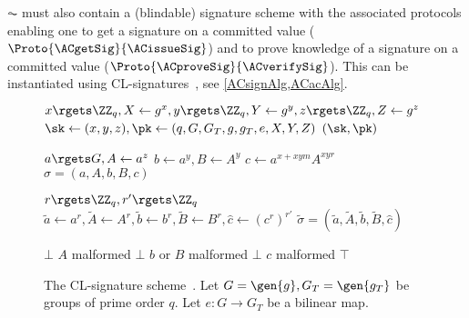 \(\AC\) must also contain a (blindable) signature scheme with the associated 
protocols enabling one to get a signature on a committed value 
(\(\Proto{\ACgetSig}{\ACissueSig}\)) and to prove knowledge of a signature on a 
committed value (\(\Proto{\ACproveSig}{\ACverifySig}\)).
This can be instantiated using CL-signatures~\cite{CLsignatures}, see 
\cref{ACsignAlg,ACacAlg}.

\begin{figure}[p]
  \small
  \begin{algorithmic}
    \Function{\CLsetup}{}
    \State $x\rgets \ZZ_q, X\gets g^x, y\rgets \ZZ_q, Y\gets g^y, z\rgets 
    \ZZ_q, Z\gets g^z$
    \State $\sk\gets (x,y,z), \pk\gets (q, G, G_T, g, g_T, e, X, Y, Z)$
    \State \Return $(\sk, \pk)$
    \EndFunction

    \State $a\rgets G, A\gets a^z$
    \State $b\gets a^y, B\gets A^y$
    \State $c\gets a^{x+xym} A^{xyr}$
    \State \Return $\sigma = (a, A, b, B, c)$
    \EndFunction

    \State $r\rgets \ZZ_q, r'\rgets \ZZ_q$
    \State $\tilde a\gets a^r, \tilde A\gets A^r,
      \tilde b\gets b^r, \tilde B\gets B^r,
      \hat c\gets (c^r)^{r'}$
    \State \Return $\tilde \sigma = (\tilde a, \tilde A,
      \tilde b, \tilde B, \hat c)$
    \EndFunction

    \State \Return $\bot$
    \Comment $A$ malformed
    \State \Return $\bot$
    \Comment $b$ or $B$ malformed
    \State \Return $\bot$
    \Comment $c$ malformed
    \EndIf
    \State \Return $\top$
    \EndFunction

  \end{algorithmic}
  \caption{\label{ACsignAlg}%
    The CL-signature scheme~\cite{CLsignatures}.
    Let \(G = \gen{g}, G_T = \gen{g_T}\) be groups of prime order \(q\).
    Let \(e\colon G\to G_T\) be a bilinear map.
  }
\end{figure}

